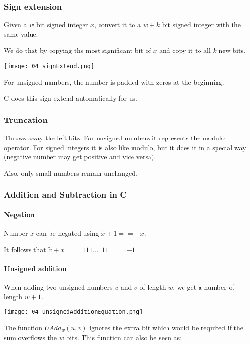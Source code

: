 

\subsubsection{Sign extension}
Given a $w$ bit signed integer $x$, convert it to a $w + k$ bit signed integer with the same value.

We do that by copying the most significant bit of $x$ and copy it to all $k$ new bits.

\texttt{[image: 04\_signExtend.png]}

For unsigned numbers, the number is padded with zeros at the beginning.

C does this sign extend automatically for us.

\subsubsection{Truncation}
Throws away the left bits. For unsigned numbers it represents the modulo operator. For signed integers it is also like modulo, but it does it in a special way (negative number may get positive and vice versa).

Also, only small numbers remain unchanged.

\subsubsection{Addition and Subtraction in C}
\paragraph{Negation}
Number $x$ can be negated using $\tilde x + 1 == -x$.

It follows that $\tilde x + x == 111 \dots 111 == -1$

\paragraph{Unsigned addition}
When adding two unsigned numbers $u$ and $v$ of length $w$, we get a number of length $w + 1$.

\texttt{[image: 04\_unsignedAdditionEquation.png]}

The function $UAdd_w(u,v)$ ignores the extra bit which would be required if the sum overflows the $w$ bits. This function can also be seen as:

